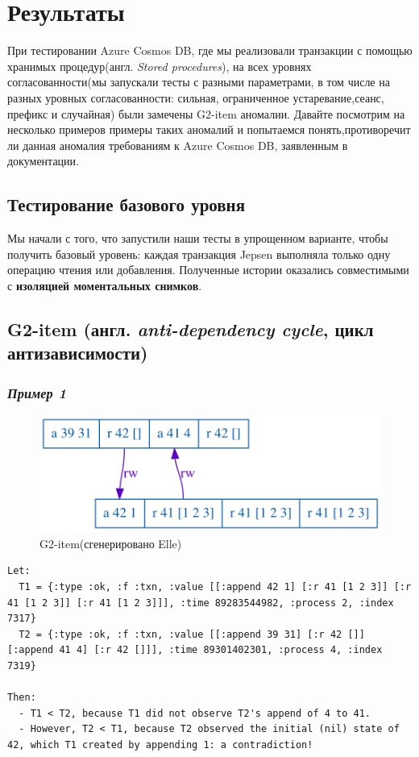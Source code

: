 \documentclass[12pt,  openany]{book}
\begin{document}
\section{Результаты}
При тестировании Azure Cosmos DB, где мы реализовали транзакции с помощью хранимых процедур(англ. \textit{Stored procedures}), на всех уровнях согласованности(мы запускали тесты с разными параметрами, в том числе на разных уровных согласованности: сильная, ограниченное устаревание,сеанс, префикс и случайная) были замечены G2-item  аномалии. Давайте посмотрим на несколько примеров примеры таких аномалий и попытаемся понять,противоречит ли данная аномалия требованиям к Azure Cosmos DB, заявленным в документации.
\subsection{Тестирование базового уровня}
Мы начали с того, что запустили наши тесты в упрощенном варианте, чтобы получить базовый уровень: каждая транзакция Jepsen выполняла только одну операцию чтения или добавления.
Полученные истории оказались совместимыми с \textbf{изоляцией моментальных снимков}.

\subsection{G2-item (англ. \textit{anti-dependency cycle}, цикл антизависимости)}
\subsubsection{\textit{Пример 1}}
\begin{figure}[H]
  \includegraphics[width=\textwidth]{staleness/32.png}
  \caption{G2-item(сгенерировано Elle)}
\end{figure}
\par

\begin{lstlisting}[caption={Пояснение к G2-item аномалии (сгенерировано Elle)}]
Let:
  T1 = {:type :ok, :f :txn, :value [[:append 42 1] [:r 41 [1 2 3]] [:r 41 [1 2 3]] [:r 41 [1 2 3]]], :time 89283544982, :process 2, :index 7317}
  T2 = {:type :ok, :f :txn, :value [[:append 39 31] [:r 42 []] [:append 41 4] [:r 42 []]], :time 89301402301, :process 4, :index 7319}

Then:
  - T1 < T2, because T1 did not observe T2's append of 4 to 41.
  - However, T2 < T1, because T2 observed the initial (nil) state of 42, which T1 created by appending 1: a contradiction!
\end{lstlisting}
\end{document}

